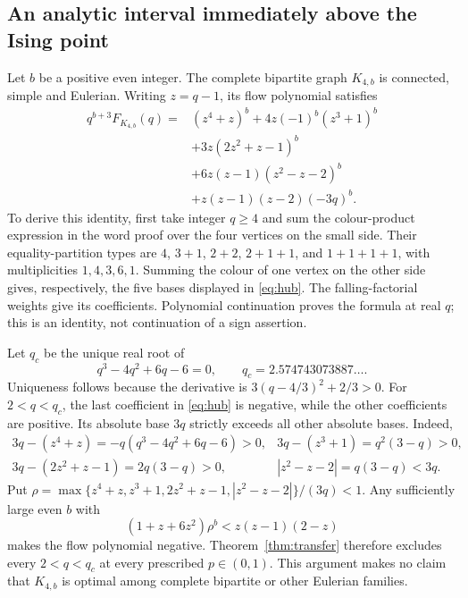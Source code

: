 \documentclass[11pt,a4paper]{article}
\theoremstyle{remark}\newtheorem{remark}[theorem]{Remark}
\begin{document}
\subsection{An analytic interval immediately above the Ising point}\label{sec:hub}
Let $b$ be a positive even integer. The complete bipartite graph $K_{4,b}$ is connected, simple and Eulerian. Writing $z=q-1$, its flow polynomial satisfies
\begin{equation}\label{eq:hub}
\begin{split}
q^{b+3}F_{K_{4,b}}(q)={}&(z^4+z)^b+4z(-1)^b(z^3+1)^b\\
 &+3z(2z^2+z-1)^b\\
 &+6z(z-1)(z^2-z-2)^b\\
 &+z(z-1)(z-2)(-3q)^b.
\end{split}
\end{equation}
To derive this identity, first take integer $q\ge4$ and sum the colour-product expression in the word proof over the four vertices on the small side. Their equality-partition types are $4$, $3+1$, $2+2$, $2+1+1$, and $1+1+1+1$, with multiplicities $1,4,3,6,1$. Summing the colour of one vertex on the other side gives, respectively, the five bases displayed in \eqref{eq:hub}. The falling-factorial weights give its coefficients. Polynomial continuation proves the formula at real $q$; this is an identity, not continuation of a sign assertion.

Let $q_c$ be the unique real root of
\[
q^3-4q^2+6q-6=0,
\qquad q_c=2.574743073887\ldots.
\]
Uniqueness follows because the derivative is $3(q-4/3)^2+2/3>0$. For $2<q<q_c$, the last coefficient in \eqref{eq:hub} is negative, while the other coefficients are positive. Its absolute base $3q$ strictly exceeds all other absolute bases. Indeed,
\[
\begin{array}{ll}
3q-(z^4+z)=-q(q^3-4q^2+6q-6)>0,&
3q-(z^3+1)=q^2(3-q)>0,\\
3q-(2z^2+z-1)=2q(3-q)>0,&
|z^2-z-2|=q(3-q)<3q.
\end{array}
\]
Put $\rho=\max\{z^4+z,z^3+1,2z^2+z-1,|z^2-z-2|\}/(3q)<1$. Any sufficiently large even $b$ with
\[
(1+z+6z^2)\rho^b<z(z-1)(2-z)
\]
makes the flow polynomial negative. Theorem~\ref{thm:transfer} therefore excludes every $2<q<q_c$ at every prescribed $p\in(0,1)$. This argument makes no claim that $K_{4,b}$ is optimal among complete bipartite or other Eulerian families.
\end{document}
